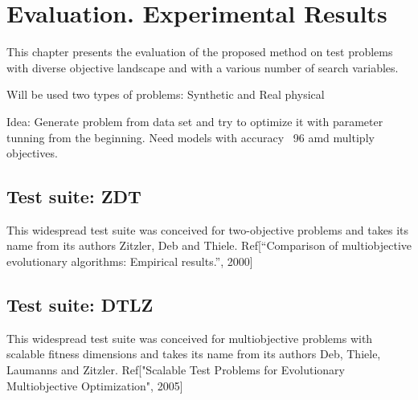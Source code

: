 \chapter{Evaluation. Experimental Results} 
This chapter presents the evaluation of the proposed method on test problems with diverse objective landscape and with a various number of search variables.

\cite{kouwe2018benchmarking}

Will be used two types of problems: Synthetic and Real physical

Idea: Generate problem from data set and try to optimize it with parameter tunning from the beginning. 
Need models with accuracy ~96 amd multiply objectives. 

\section{Test suite: ZDT}
This widespread test suite was conceived for two-objective problems and takes its name from its authors Zitzler, Deb and Thiele.
Ref[“Comparison of multiobjective evolutionary algorithms: Empirical results.”, 2000]

\section{Test suite: DTLZ}
This widespread test suite was conceived for multiobjective problems with scalable fitness dimensions and takes its name from its authors Deb, Thiele, Laumanns and Zitzler.
Ref["Scalable Test Problems for Evolutionary Multiobjective Optimization", 2005]

